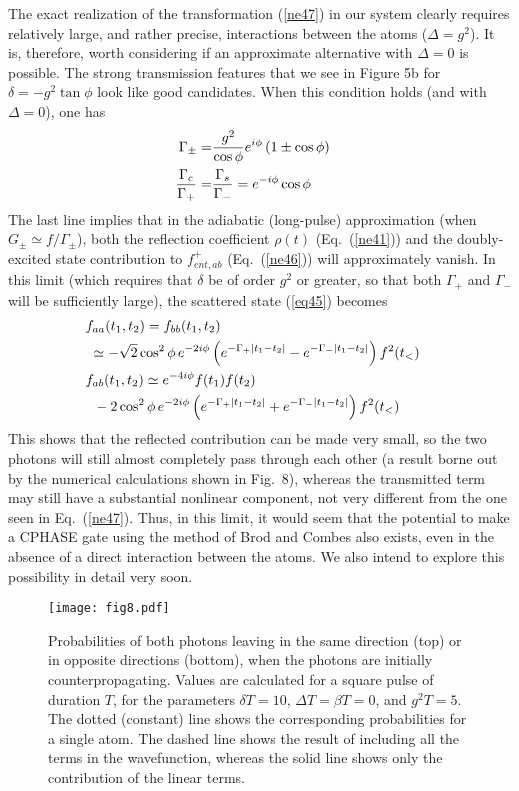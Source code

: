 \documentclass[aps,pra,twocolumn,floatfix,superscriptaddress]{revtex4}
\begin{document}
The exact realization of the transformation (\ref{ne47}) in our system clearly requires relatively large, and rather precise, interactions between the atoms ($\Delta = g^2$).  It is, therefore, worth considering if an approximate alternative with $\Delta =0$ is possible.  The strong transmission features that we see in Figure 5b for $\delta = -g^2\tan\phi$ look like good candidates.  When this condition holds (and with $\Delta=0$), one has
\begin{align}
\Gamma_{\pm} = &\frac{g^2}{\cos\phi} e^{i\phi}\left( 1 \pm\cos\phi\right) \cr
\frac{\Gamma_c}{\Gamma_+} = &\frac{\Gamma_s}{\Gamma_-} = e^{-i\phi}\cos\phi
\end{align}
The last line implies that in the adiabatic (long-pulse) approximation (when $G_\pm \simeq f/\Gamma_\pm$), both the reflection coefficient $\rho(t)$ (Eq.~(\ref{ne41})) and the doubly-excited state contribution to $f_{ent,ab}^{+}$ (Eq.~(\ref{ne46})) will approximately vanish. In this limit (which requires that $\delta$ be of order $g^2$ or greater, so that both $\Gamma_+$ and $\Gamma_-$ will be sufficiently large), the scattered state (\ref{eq45}) becomes 
\begin{align}
&f_{aa}(t_1,t_2) = f_{bb}(t_1,t_2) \cr
&\;\simeq -\sqrt 2 \cos^2\phi\, e^{-2 i \phi} \left(e^{-\Gamma_+|t_1-t_2|} - e^{-\Gamma_-|t_1-t_2|} \right) f^2(t_<) \cr
&f_{ab}(t_1,t_2) \simeq e^{-4i\phi} f(t_1)f(t_2) \cr
&\;\;- 2 \cos^2\phi \,e^{-2 i \phi} \left(e^{-\Gamma_+|t_1-t_2|} + e^{-\Gamma_-|t_1-t_2|} \right) f^2(t_<)
\cr
\label{e48}
\end{align}
This shows that the reflected contribution can be made very small, so the two photons will still almost completely pass through each other (a result borne out by the numerical calculations shown in Fig.~8), whereas the transmitted term may still have a substantial nonlinear component, not very different from the one seen in Eq.~(\ref{ne47}).  Thus, in this limit, it would seem that the potential to make a CPHASE gate using the method of Brod and Combes also exists, even in the absence of a direct interaction between the atoms. We also intend to explore this possibility in detail very soon. 

\begin{figure}
\texttt{[image: fig8.pdf]}
\caption{\label{fig8} Probabilities of both photons leaving in the same direction (top) or in opposite directions (bottom), when the photons are initially counterpropagating. Values are calculated for a square pulse of duration $T$, for the parameters $\delta T=10$, $\Delta T=\beta T=0$, and $g^2 T=5$.  The dotted (constant) line shows the corresponding probabilities for a single atom. The dashed line shows the result of including all the terms in the wavefunction, whereas the solid line shows only the contribution of the linear terms.}  %
\end{figure}
\end{document}
